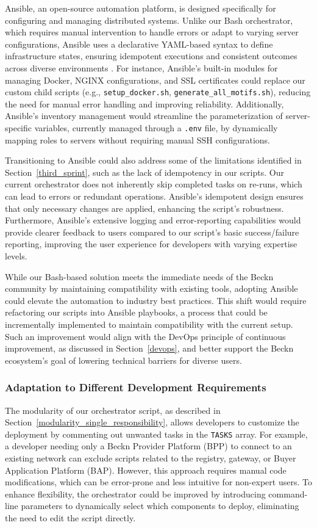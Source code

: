 Ansible, an open-source automation platform, is designed specifically for configuring and managing distributed systems. Unlike our Bash orchestrator, which requires manual intervention to handle errors or adapt to varying server configurations, Ansible uses a declarative YAML-based syntax to define infrastructure states, ensuring idempotent executions and consistent outcomes across diverse environments \citep{morris_2020}. For instance, Ansible's built-in modules for managing Docker, NGINX configurations, and SSL certificates could replace our custom child scripts (e.g., \texttt{setup\_docker.sh}, \texttt{generate\_all\_motifs.sh}), reducing the need for manual error handling and improving reliability. Additionally, Ansible's inventory management would streamline the parameterization of server-specific variables, currently managed through a \texttt{.env} file, by dynamically mapping roles to servers without requiring manual SSH configurations.

Transitioning to Ansible could also address some of the limitations identified in Section~\ref{third_sprint}, such as the lack of idempotency in our scripts. Our current orchestrator does not inherently skip completed tasks on re-runs, which can lead to errors or redundant operations. Ansible's idempotent design ensures that only necessary changes are applied, enhancing the script's robustness. Furthermore, Ansible's extensive logging and error-reporting capabilities would provide clearer feedback to users compared to our script's basic success/failure reporting, improving the user experience for developers with varying expertise levels.

While our Bash-based solution meets the immediate needs of the Beckn community by maintaining compatibility with existing tools, adopting Ansible could elevate the automation to industry best practices. This shift would require refactoring our scripts into Ansible playbooks, a process that could be incrementally implemented to maintain compatibility with the current setup. Such an improvement would align with the DevOps principle of continuous improvement, as discussed in Section~\ref{devops}, and better support the Beckn ecosystem's goal of lowering technical barriers for diverse users.

\subsubsection{Adaptation to Different Development Requirements}
The modularity of our orchestrator script, as described in Section~\ref{modularity_single_responsibility}, allows developers to customize the deployment by commenting out unwanted tasks in the \texttt{TASKS} array. For example, a developer needing only a Beckn Provider Platform (BPP) to connect to an existing network can exclude scripts related to the registry, gateway, or Buyer Application Platform (BAP). However, this approach requires manual code modifications, which can be error-prone and less intuitive for non-expert users. To enhance flexibility, the orchestrator could be improved by introducing command-line parameters to dynamically select which components to deploy, eliminating the need to edit the script directly.

